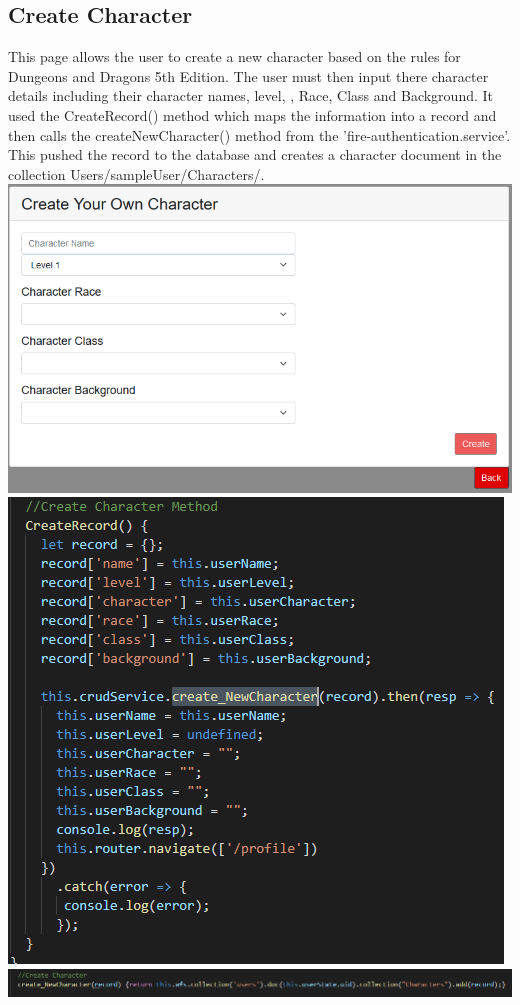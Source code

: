 \subsection{Create Character}
This page allows the user to create a new character based on the rules for Dungeons and Dragons 5th Edition. The user must then input there character details including their character names, level, , Race, Class and Background. It used the  CreateRecord() method which maps the information into a record and then calls the createNewCharacter() method from the 'fire-authentication.service'. This pushed the record to the database and creates a character document in the collection Users/sampleUser/Characters/.\\
\includegraphics[scale=0.3]{./img/CreateCharacter.png} \\
\includegraphics[scale=0.3]{./img/CreateRecord.png} \\
\includegraphics[scale=0.3]{./img/CreateNewCharacter.png} \\

